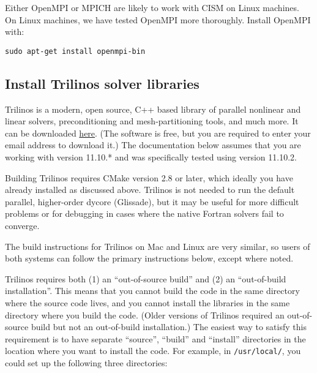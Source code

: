 \begin{mdframed}[style=ubuntu] %
Either OpenMPI or MPICH are likely to work with CISM on Linux machines.
On Linux machines, we have tested OpenMPI more thoroughly.
Install OpenMPI with:

\texttt{sudo apt-get install openmpi-bin}
\end{mdframed}                 %



\subsection{Install Trilinos solver libraries}
\label{sc:install_trilinos}

Trilinos is a modern, open source, C++ based library of parallel nonlinear and linear solvers, 
preconditioning and mesh-partitioning tools, and much more. It can be downloaded 
\href{trilinos.sandia.gov/download/}{here}.
(The software is free, but you are required to enter your email address to download it.) 
The documentation below assumes that you are working with version 11.10.* and was specifically 
tested using version 11.10.2. 

Building Trilinos requires CMake version 2.8 or later, which ideally you have already 
installed as discussed above. Trilinos is not needed to run the default 
parallel, higher-order dycore (Glissade), but it may be useful for  
more difficult problems or for debugging in cases where the native Fortran solvers 
fail to converge.

The build instructions for Trilinos on Mac and Linux are very similar, so users
of both systems can follow the primary instructions below, except where noted.

Trilinos requires both (1) an ``out-of-source build'' and (2) an ``out-of-build installation''. 
This means that you cannot build the code in the same directory where the source code lives, 
and you cannot install the libraries in the same directory where you build the code.
(Older versions of Trilinos required an out-of-source build but not an out-of-build installation.) 
The easiest way to satisfy this requirement is to have separate ``source'', ``build'' and 
``install'' directories in the location where you want to install the code. 
For example, in \texttt{/usr/local/}, you could set up the following three directories:

